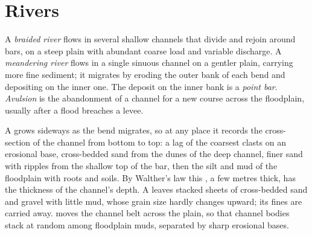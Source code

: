 \section{Rivers}\label{sec:b3:facies-models:rivers}

\begin{definition}\label{def:b3:facies-models:rivers}
A \emph{braided river} flows in several shallow
channels that divide and rejoin around bars, on a steep plain with abundant
coarse load and variable discharge. A \emph{meandering river}
flows in a single sinuous channel on a gentler plain, carrying more
fine sediment; it migrates by eroding the outer bank of each bend and
depositing on the inner one. The deposit on the inner bank is a \emph{point
bar}. \emph{Avulsion} is the abandonment of
a channel for a new course across the floodplain, usually after a flood
breaches a levee.
\end{definition}

A  grows sideways as the bend migrates, so at any place it records
the cross-section of the channel from bottom to top: a lag of the coarsest
clasts on an erosional base, cross-bedded sand from the dunes of the deep
channel, finer sand with ripples from the shallow top of the bar, then the
silt and mud of the floodplain with roots and soils. By Walther's law this
, a few metres thick, has the thickness of the
channel's depth. A  leaves stacked sheets of cross-bedded sand
and gravel with little mud, whose grain size hardly changes upward; its fines
are carried away.  moves the channel belt across the plain, so that
channel bodies stack at random among floodplain muds, separated by sharp
erosional bases.

